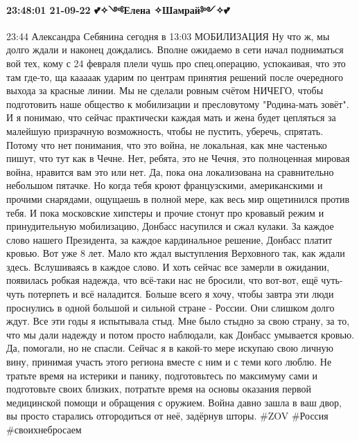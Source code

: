 \paragraph{23:48:01 21-09-22 💕✧༺Елена ✧Шамрай༻✧💕}
23:44
Александра Себянина
сегодня в 13:03
МОБИЛИЗАЦИЯ
Ну что ж, мы долго ждали и наконец дождались. Вполне ожидаемо в сети начал подниматься вой тех, кому с 24 февраля плели чушь про спец.операцию, успокаивая, что это там где-то, ща кааааак ударим по центрам принятия решений после очередного выхода за красные линии. Мы не сделали ровным счётом НИЧЕГО, чтобы подготовить наше общество к мобилизации и пресловутому "Родина-мать зовёт". И я понимаю, что сейчас практически каждая мать и жена будет цепляться за малейшую призрачную возможность, чтобы не пустить, уберечь, спрятать. Потому что нет понимания, что это война, не локальная, как мне частенько пишут, что тут как в Чечне. Нет, ребята, это не Чечня, это полноценная мировая война, нравится вам это или нет. Да, пока она локализована на сравнительно небольшом пятачке. Но когда тебя кроют французскими, американскими и прочими снарядами, ощущаешь в полной мере, как весь мир ощетинился против тебя.
И пока московские хипстеры и прочие стонут про кровавый режим и принудительную мобилизацию, Донбасс насупился и сжал кулаки. За каждое слово нашего Президента, за каждое кардинальное решение, Донбасс платит кровью. Вот уже 8 лет. Мало кто ждал выступления Верховного так, как ждали здесь. Вслушиваясь в каждое слово. И хоть сейчас все замерли в ожидании, появилась робкая надежда, что всё-таки нас не бросили, что вот-вот, ещё чуть-чуть потерпеть и всё наладится.
Больше всего я хочу, чтобы завтра эти люди проснулись в одной большой и сильной стране - России. Они слишком долго ждут. Все эти годы я испытывала стыд. Мне было стыдно за свою страну, за то, что мы дали надежду и потом просто наблюдали, как Донбасс умывается кровью. Да, помогали, но не спасли. Сейчас я в какой-то мере искупаю свою личную вину, принимая участь этого региона вместе с ним и с теми кого люблю.
Не тратьте время на истерики и панику, подготовьтесь по максимуму сами и подготовьте своих близких, потратьте время на основы оказания первой медицинской помощи и обращения с оружием. Война давно зашла в ваш двор, вы просто старались отгородиться от неё, задёрнув шторы.
#ZOV #Россия #своихнебросаем

